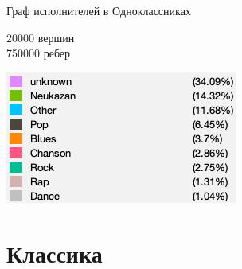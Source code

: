 \documentclass[11pt,aspectratio=169,handout]{beamer}
\begin{document}
{
\begin{frame}[plain]{Граф исполнителей в Одноклассниках}

20000 вершин \\
750000 ребер

\vspace{1em}

\includegraphics[scale=0.4]{images/ok-music-graph-legend.png}

\end{frame}
}

\section{Классика}
\end{document}
